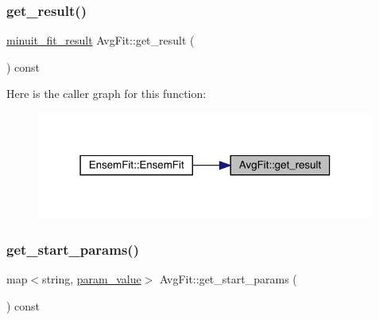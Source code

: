 \mbox{\label{classAvgFit_a2d288928c4cf2f92ee28fce2503da979}} 
\subsubsection{\texorpdfstring{get\_result()}{get\_result()}\hspace{0.1cm}{\footnotesize\ttfamily [2/2]}}
{\footnotesize\ttfamily \mbox{\hyperlink{structminuit__fit__result}{minuit\+\_\+fit\+\_\+result}} Avg\+Fit\+::get\+\_\+result (\begin{DoxyParamCaption}{ }\end{DoxyParamCaption}) const\hspace{0.3cm}{\ttfamily [inline]}}

Here is the caller graph for this function\+:
\nopagebreak
\begin{figure}[H]
\begin{center}
\leavevmode
\includegraphics[width=316pt]{d4/dfd/classAvgFit_a2d288928c4cf2f92ee28fce2503da979_icgraph}
\end{center}
\end{figure}
\mbox{\label{classAvgFit_a7823eaaddd8f06848f2c092886076d0d}} 
\subsubsection{\texorpdfstring{get\_start\_params()}{get\_start\_params()}\hspace{0.1cm}{\footnotesize\ttfamily [1/2]}}
{\footnotesize\ttfamily map$<$string, \mbox{\hyperlink{structparam__value}{param\+\_\+value}}$>$ Avg\+Fit\+::get\+\_\+start\+\_\+params (\begin{DoxyParamCaption}{ }\end{DoxyParamCaption}) const\hspace{0.3cm}{\ttfamily [inline]}}

